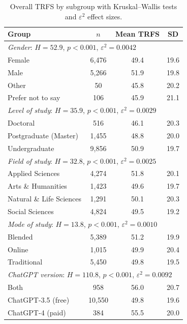 \begin{table}[!htbp]
\centering
\caption{Overall TRFS by subgroup with Kruskal--Wallis tests and $\varepsilon^2$ effect sizes.}
\label{tab:A-subgroups}
\footnotesize
\begin{tabular}{lccc}
\toprule
Group & $n$ & Mean TRFS & SD\\
\midrule
\multicolumn{4}{l}{\textit{Gender}: $H=52.9$, $p<0.001$, $\varepsilon^2=0.0042$}\\
\quad Female & 6,476 & 49.4 & 19.6\\
\quad Male & 5,266 & 51.9 & 19.8\\
\quad Other & 50 & 45.8 & 20.2\\
\quad Prefer not to say & 106 & 45.9 & 21.1\\
\multicolumn{4}{l}{\textit{Level of study}: $H=35.9$, $p<0.001$, $\varepsilon^2=0.0029$}\\
\quad Doctoral & 516 & 46.1 & 20.3\\
\quad Postgraduate (Master) & 1,455 & 48.8 & 20.0\\
\quad Undergraduate & 9,856 & 50.9 & 19.7\\
\multicolumn{4}{l}{\textit{Field of study}: $H=32.8$, $p<0.001$, $\varepsilon^2=0.0025$}\\
\quad Applied Sciences & 4,274 & 51.8 & 20.1\\
\quad Arts \& Humanities & 1,423 & 49.6 & 19.7\\
\quad Natural \& Life Sciences & 1,291 & 50.1 & 20.3\\
\quad Social Sciences & 4,824 & 49.5 & 19.2\\
\multicolumn{4}{l}{\textit{Mode of study}: $H=13.8$, $p<0.001$, $\varepsilon^2=0.0010$}\\
\quad Blended & 5,389 & 51.2 & 19.9\\
\quad Online & 1,015 & 49.9 & 20.4\\
\quad Traditional & 5,450 & 49.8 & 19.5\\
\multicolumn{4}{l}{\textit{ChatGPT version}: $H=110.8$, $p<0.001$, $\varepsilon^2=0.0092$}\\
\quad Both & 958 & 56.0 & 20.7\\
\quad ChatGPT-3.5 (free) & 10,550 & 49.8 & 19.6\\
\quad ChatGPT-4 (paid) & 384 & 55.5 & 20.0\\
\bottomrule
\end{tabular}
\end{table}

